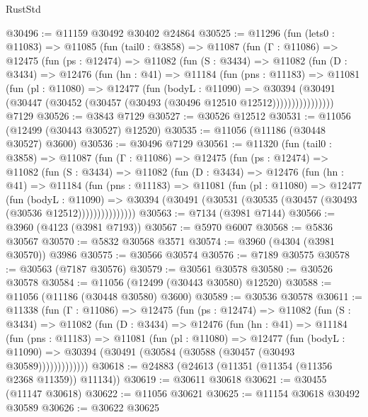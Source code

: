 \begin{lexlean}{RustStd}
\begin{coremodule}
@30496 := @11159 @30492 @30402 @24864
@30525 := @11296
    (fun (lets0 : @11083) =>
    @11085
      (fun (tail0 : @3858) =>
      @11087
        (fun (Γ : @11086) =>
        @12475
          (fun (ps : @12474) =>
          @11082
            (fun (S : @3434) =>
            @11082
              (fun (D : @3434) =>
              @12476
                (fun (hn : @41) =>
                @11184
                  (fun (pns : @11183) =>
                  @11081
                    (fun (pl : @11080) =>
                    @12477
                      (fun (bodyL : @11090) =>
                      @30394
                        (@30491
                          (@30447 (@30452 (@30457 (@30493 (@30496 @12510 @12512))))))))))))))))
    @7129
@30526 := @3843 @7129
@30527 := @30526 @12512
@30531 := @11056 (@12499 (@30443 @30527) @12520)
@30535 := @11056 (@11186 (@30448 @30527) @3600)
@30536 := @30496 @7129
@30561 := @11320
    (fun (tail0 : @3858) =>
    @11087
      (fun (Γ : @11086) =>
      @12475
        (fun (ps : @12474) =>
        @11082
          (fun (S : @3434) =>
          @11082
            (fun (D : @3434) =>
            @12476
              (fun (hn : @41) =>
              @11184
                (fun (pns : @11183) =>
                @11081
                  (fun (pl : @11080) =>
                  @12477
                    (fun (bodyL : @11090) =>
                    @30394 (@30491 (@30531 (@30535 (@30457 (@30493 (@30536 @12512)))))))))))))))
@30563 := @7134 (@3981 @7144)
@30566 := @3960 (@4123 (@3981 @7193))
@30567 := @5970 @6007
@30568 := @5836 @30567
@30570 := @5832 @30568 @3571
@30574 := @3960 (@4304 (@3981 @30570)) @3986
@30575 := @30566 @30574
@30576 := @7189 @30575
@30578 := @30563 (@7187 @30576)
@30579 := @30561 @30578
@30580 := @30526 @30578
@30584 := @11056 (@12499 (@30443 @30580) @12520)
@30588 := @11056 (@11186 (@30448 @30580) @3600)
@30589 := @30536 @30578
@30611 := @11338
    (fun (Γ : @11086) =>
    @12475
      (fun (ps : @12474) =>
      @11082
        (fun (S : @3434) =>
        @11082
          (fun (D : @3434) =>
          @12476
            (fun (hn : @41) =>
            @11184
              (fun (pns : @11183) =>
              @11081
                (fun (pl : @11080) =>
                @12477
                  (fun (bodyL : @11090) =>
                  @30394 (@30491 (@30584 (@30588 (@30457 (@30493 @30589)))))))))))))
@30618 := @24883 (@24613 (@11351 (@11354 (@11356 @2368 @11359)) @11134))
@30619 := @30611 @30618
@30621 := @30455 (@11147 @30618)
@30622 := @11056 @30621
@30625 := @11154 @30618 @30492 @30589
@30626 := @30622 @30625

\end{coremodule}
\end{lexlean}
